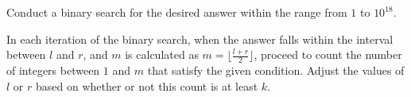 Conduct a binary search for the desired answer within the range from $1$ to $10^{18}$.

In each iteration of the binary search, when the answer falls within the interval between $l$ and $r$, 
and $m$ is calculated as $m = \lfloor \frac{l+r}{2} \rfloor$, 
proceed to count the number of integers between $1$ and $m$ that satisfy the given condition.
Adjust the values of $l$ or $r$ based on whether or not this count is at least $k$.

